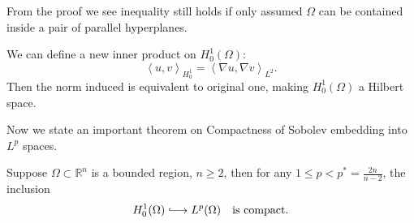 \documentclass[UTF8,12pt]{article}
\numberwithin{theorem}{section}
\numberwithin{equation}{section}
\newcommand{\hooklongrightarrow}{\lhook\joinrel\longrightarrow}
\begin{document}
\begin{remark}
    From the proof we see inequality still holds if only assumed \(\Omega\) can be
    contained inside a pair of parallel hyperplanes.
\end{remark}

\begin{corollary}
    We can define a new inner product on \(H_0^1(\Omega)\): \[
        \left<u,v\right>_{H_0^1}=\left<\nabla u,\nabla v\right>_{L^2}
    .\] Then the norm induced is equivalent to original one, making \(H_0^1(\Omega)\)
    a Hilbert space.
\end{corollary}

Now we state an important theorem on Compactness of Sobolev embedding into 
\(L^p\) spaces.
\begin{theorem}[Rellich]\label{thm:cpt-Lp}\hfill\par
    Suppose \(\Omega\subset \mathbb{R}^n\) is a bounded region, \(n\ge 2\),
    then for any \(1\le p<p^*=\frac{2n}{n-2}\), the inclusion \[
        H_0^1(\Omega)\hooklongrightarrow L^p(\Omega)
        \quad\text{is compact.}
    \] 
\end{theorem}
\end{document}
